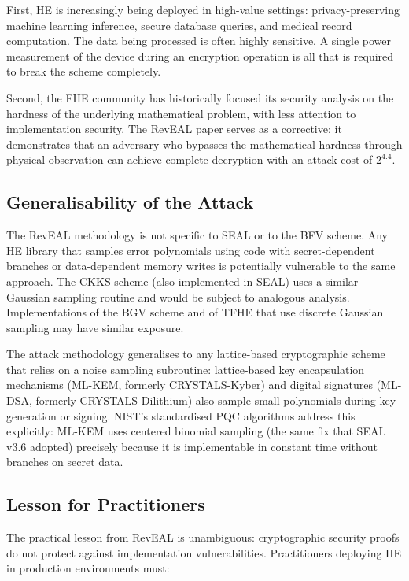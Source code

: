 \documentclass[sigconf,nonacm]{acmart}
\begin{document}
First, HE is increasingly being deployed in high-value settings: privacy-preserving
machine learning inference, secure database queries, and medical record computation.
The data being processed is often highly sensitive. A single power measurement of
the device during an encryption operation is all that is required to break the
scheme completely.

Second, the FHE community has historically focused its security analysis on the
hardness of the underlying mathematical problem, with less attention to implementation
security. The RevEAL paper serves as a corrective: it demonstrates that an adversary
who bypasses the mathematical hardness through physical observation can achieve
complete decryption with an attack cost of $2^{4.4}$.

\subsection{Generalisability of the Attack}

The RevEAL methodology is not specific to SEAL or to the BFV scheme. Any HE library
that samples error polynomials using code with secret-dependent branches or
data-dependent memory writes is potentially vulnerable to the same approach. The
CKKS scheme (also implemented in SEAL) uses a similar Gaussian sampling routine and
would be subject to analogous analysis. Implementations of the BGV scheme and of
TFHE that use discrete Gaussian sampling may have similar exposure.

The attack methodology generalises to any lattice-based cryptographic scheme that
relies on a noise sampling subroutine: lattice-based key encapsulation mechanisms
(ML-KEM, formerly CRYSTALS-Kyber) and digital signatures (ML-DSA, formerly
CRYSTALS-Dilithium) also sample small polynomials during key generation or signing.
NIST's standardised PQC algorithms address this explicitly: ML-KEM uses centered
binomial sampling (the same fix that SEAL v3.6 adopted) precisely because it is
implementable in constant time without branches on secret data.

\subsection{Lesson for Practitioners}

The practical lesson from RevEAL is unambiguous: cryptographic security proofs do not
protect against implementation vulnerabilities. Practitioners deploying HE in
production environments must:
\end{document}
